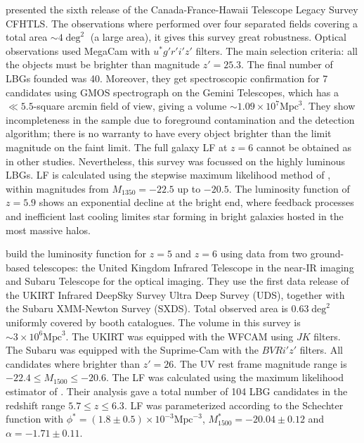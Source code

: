 \documentclass{emulateapj}
\begin{document}
\citet{willott13} presented the sixth release of the Canada-France-Hawaii 
Telescope Legacy Survey CFHTLS. The observations where performed over four 
separated fields covering a total area $\sim 4 \deg^2$ (a large area), it gives this 
survey great robustness. Optical observations used MegaCam  %
with $u^* g' r' i' z'$ filters. The main selection criteria: all the 
objects must be brighter than magnitude $z' = 25.3$. The final 
number of LBGs founded was 40. Moreover, they get spectroscopic confirmation 
for 7 candidates using GMOS spectrograph on the Gemini Telescopes, which 
has a $\ll 5.5$-square arcmin field of view, giving a volume $\sim 1.09 \times 10^7 \textrm{Mpc}^3$. 
They show incompleteness in the sample due to 
foreground contamination and the detection algorithm; there is no warranty to 
have every object brighter than the limit magnitude on the faint limit. The full 
galaxy LF at $z=6$ cannot be obtained as in other studies. Nevertheless, this survey 
was focussed on the highly luminous LBGs. LF is calculated using the stepwise 
maximum likelihood method of \citet{efstathiou88}, within 
magnitudes 
from $M_{1350} = -22.5$ up to $-20.5$. The luminosity function of $z=5.9$ shows 
an exponential decline at the bright end, where feedback processes and inefficient 
last cooling limites star forming in bright galaxies hosted in the most massive halos.

\citet{mclure09} build the luminosity function for $z=5$ and $z=6$ using data from two ground-based
 telescopes: the United Kingdom Infrared Telescope in the near-IR imaging and Subaru 
 Telescope for the optical imaging. They use the first data release of the UKIRT Infrared 
 DeepSky Survey Ultra Deep Survey (UDS), together with the Subaru XMM-Newton 
 Survey (SXDS). Total observed area is $0.63 \deg^2$ uniformly covered by booth catalogues.
The volume in this survey is $\sim 3 \times 10^6 \textrm{Mpc}^3$.
The UKIRT was equipped with the WFCAM using $J K$ filters. The Subaru was equipped 
with the Suprime-Cam with the $B V R i' z'$ filters. All candidates where brighter than 
$z'=26$. The UV rest frame magnitude range is $-22.4\leq M_{1500} \leq-20.6$. The LF 
was calculated using the maximum likelihood estimator of \citet{schmidt68}. 
Their analysis gave a total number of 104 LBG candidates in the redshift range 
$5.7\leq z \leq 6.3$. LF was parameterized according to the Schechter function with 
$\phi^*  =(1.8 \pm 0.5) \times 10 ^{-3}  \textrm{Mpc}^{-3}$, $M^*_{1500} = -20.04\pm 0.12$ 
and $\alpha = -1.71 \pm 0.11$. 
\end{document}
